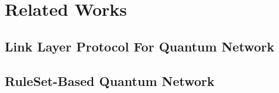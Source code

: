 \chapter{Related Works}
\label{related works}

\section{Link Layer Protocol For Quantum Network}

\section{RuleSet-Based Quantum Network}
